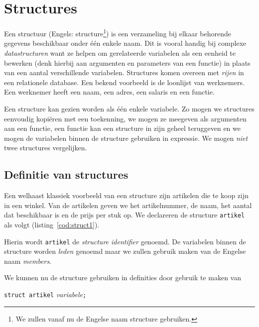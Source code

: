 \chapter{Structures}
\label{cha:structures}
\thispagestyle{empty}

Een structuur (Engels: structure\footnote{We zullen vanaf nu de Engelse naam structure gebruiken.}) is een verzameling bij elkaar behorende gegevens beschikbaar onder één enkele naam. Dit is vooral handig bij complexe \textsl{datastructuren} want ze helpen om gerelateerde variabelen als een eenheid te bewerken (denk hierbij aan argumenten en parameters van een functie) in plaats van een aantal verschillende variabelen. Structures komen overeen met \textsl{rijen} in een relationele database. Een bekend voorbeeld is de loonlijst van werknemers. Een werknemer heeft een naam, een adres, een salaris en een functie.

Een structure kan gezien worden als één enkele variabele. Zo mogen we structures eenvoudig kopiëren met een toekenning, we mogen ze meegeven als argumenten aan een functie, een functie kan een structure in zijn geheel teruggeven en we mogen de variabelen binnen de structure gebruiken in expressie. We mogen \textsl{niet} twee structures vergelijken.


\section{Definitie van structures}
Een welhaast klassiek voorbeeld van een structure zijn artikelen die te koop zijn in een winkel. Van de artikelen geven we het artikelnummer, de naam, het aantal dat beschikbaar is en de prijs per stuk op. We declareren de structure \texttt{artikel} als volgt (listing~\ref{cod:struct1}).


Hierin wordt \texttt{artikel} de \textsl{structure identifier} genoemd. De variabelen binnen de structure worden \textsl{leden} genoemd maar we zullen gebruik maken van de Engelse naam \textsl{members}.

We kunnen nu de structure gebruiken in definities door gebruik te maken van

\hspace*{1em}\texttt{struct artikel} \textsl{variabele}\texttt{;}

